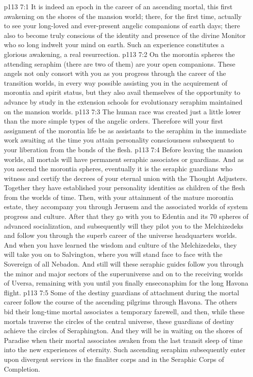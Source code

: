 \vs p113 7:1 It is indeed an epoch in the career of an ascending mortal, this first awakening on the shores of the mansion world; there, for the first time, actually to see your long\hyp{}loved and ever\hyp{}present angelic companions of earth days; there also to become truly conscious of the identity and presence of the divine Monitor who so long indwelt your mind on earth. Such an experience constitutes a glorious awakening, a real resurrection.
\vs p113 7:2 On the morontia spheres the attending seraphim (there are two of them) are your open companions. These angels not only consort with you as you progress through the career of the transition worlds, in every way possible assisting you in the acquirement of morontia and spirit status, but they also avail themselves of the opportunity to advance by study in the extension schools for evolutionary seraphim maintained on the mansion worlds.
\vs p113 7:3 The human race was created just a little lower than the more simple types of the angelic orders. Therefore will your first assignment of the morontia life be as assistants to the seraphim in the immediate work awaiting at the time you attain personality consciousness subsequent to your liberation from the bonds of the flesh.
\vs p113 7:4 Before leaving the mansion worlds, all mortals will have permanent seraphic associates or guardians. And as you ascend the morontia spheres, eventually it is the seraphic guardians who witness and certify the decrees of your eternal union with the Thought Adjusters. Together they have established your personality identities as children of the flesh from the worlds of time. Then, with your attainment of the mature morontia estate, they accompany you through Jerusem and the associated worlds of system progress and culture. After that they go with you to Edentia and its 70 spheres of advanced socialization, and subsequently will they pilot you to the Melchizedeks and follow you through the superb career of the universe headquarters worlds. And when you have learned the wisdom and culture of the Melchizedeks, they will take you on to Salvington, where you will stand face to face with the Sovereign of all Nebadon. And still will these seraphic guides follow you through the minor and major sectors of the superuniverse and on to the receiving worlds of Uversa, remaining with you until you finally enseconaphim for the long Havona flight.
\vs p113 7:5 Some of the destiny guardians of attachment during the mortal career follow the course of the ascending pilgrims through Havona. The others bid their long\hyp{}time mortal associates a temporary farewell, and then, while these mortals traverse the circles of the central universe, these guardians of destiny achieve the circles of Seraphington. And they will be in waiting on the shores of Paradise when their mortal associates awaken from the last transit sleep of time into the new experiences of eternity. Such ascending seraphim subsequently enter upon divergent services in the finaliter corps and in the Seraphic Corps of Completion.

